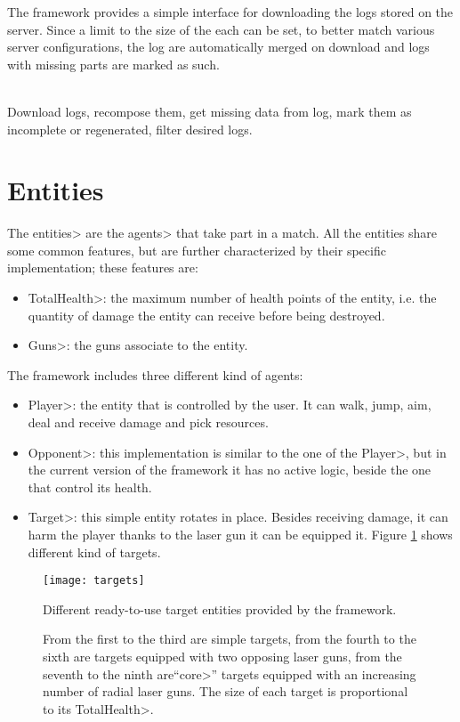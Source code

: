 The framework provides a simple interface for downloading the logs stored on the server. Since a limit to the size of the each can be set, to better match various server configurations, the log are automatically merged on download and logs with missing parts are marked as such.

\mbox{}\\

{\setlength{\parindent}{0cm}
Download logs, recompose them, get missing data from log, mark them as incomplete or regenerated, filter desired logs.}


\section{Entities}

The \<entities> are the \<agents> that take part in a match. All the entities share some common features, but are further characterized by their specific implementation; these features are:

\begin{itemize}
\item \<TotalHealth>: the maximum number of health points of the entity, i.e. the quantity of damage the entity can receive before being destroyed.
\item \<Guns>: the guns associate to the entity.
\end{itemize}

The framework includes three different kind of agents:

\begin{itemize}
\item \<Player>: the entity that is controlled by the user. It can walk, jump, aim, deal and receive damage and pick resources.
\item \<Opponent>: this implementation is similar to the one of the \<Player>, but in the current version of the framework it has no active logic, beside the one that control its health.
\item \<Target>: this simple entity rotates in place. Besides receiving damage, it can harm the player thanks to the laser gun it can be equipped it. Figure \ref{fig:targets} shows different kind of targets.
\end{itemize}

\begin{figure}
\centering
\texttt{[image: targets]}
\caption{Different ready-to-use target entities provided by the framework.}
\caption*{From the first to the third are simple targets, from the fourth to the sixth are targets equipped with two opposing laser guns, from the seventh to the ninth are``\<core>'' targets equipped with an increasing number of radial laser guns. The size of each target is proportional to its \<TotalHealth>.}
\label{fig:targets}
\end{figure}

